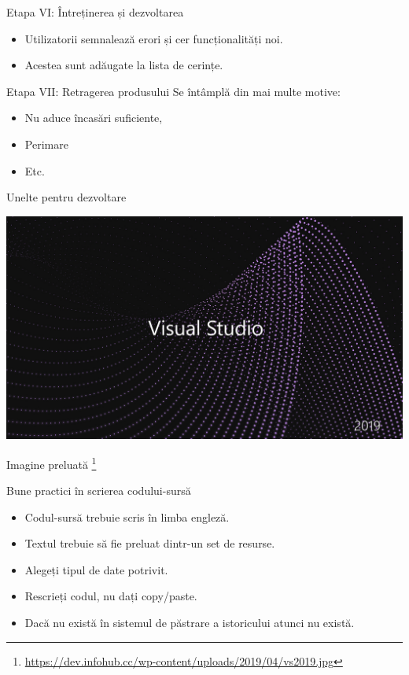 \documentclass[presentation]{beamer}
\begin{document}
\begin{frame}[label={sec:orgcf7f9af}]{Etapa VI: Întreținerea și dezvoltarea}
\begin{itemize}
\item Utilizatorii semnalează erori și cer funcționalități noi.
\item Acestea sunt adăugate la lista de cerințe.
\end{itemize}
\end{frame}
\begin{frame}[label={sec:orgfd220c5}]{Etapa VII: Retragerea produsului}
Se întâmplă din mai multe motive:
\begin{itemize}
\item Nu aduce încasări suficiente,
\item Perimare
\item Etc.
\end{itemize}
\end{frame}
\begin{frame}[label={sec:org89c4194}]{Unelte pentru dezvoltare}
\begin{center}
\includegraphics[width=.9\linewidth]{img/vs2019.jpg}
\end{center}
Imagine preluată \footnote{\url{https://dev.infohub.cc/wp-content/uploads/2019/04/vs2019.jpg}}
\end{frame}
\begin{frame}[label={sec:org646cdb9}]{Bune practici în scrierea codului-sursă}
\begin{itemize}
\item Codul-sursă trebuie scris în limba engleză.
\item Textul trebuie să fie preluat dintr-un set de resurse.
\item Alegeți tipul de date potrivit.
\item Rescrieți codul, nu dați copy/paste.
\item Dacă nu există în sistemul de păstrare a istoricului atunci nu există.
\end{itemize}
\end{frame}
\end{document}
